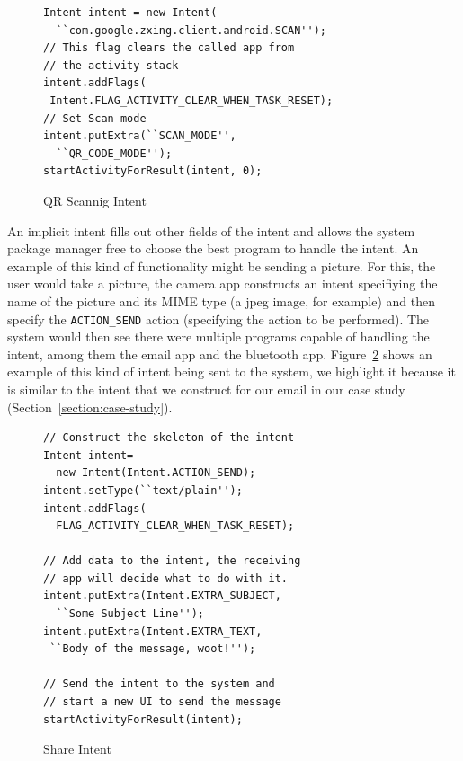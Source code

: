 \documentclass{acm_proc_article-sp}
\begin{document}
\begin{figure}
  \caption{QR Scannig Intent}
  \label{fig:qr-scanning-intent}
  \begin{lstlisting}
Intent intent = new Intent(
  ``com.google.zxing.client.android.SCAN'');
// This flag clears the called app from 
// the activity stack
intent.addFlags(
 Intent.FLAG_ACTIVITY_CLEAR_WHEN_TASK_RESET);
// Set Scan mode
intent.putExtra(``SCAN_MODE'', 
  ``QR_CODE_MODE'');
startActivityForResult(intent, 0);
  \end{lstlisting}
\end{figure}

An implicit intent fills out other fields of the intent
and allows the system package manager free to choose the best program
to handle the intent.  An example of this kind of functionality might
be sending a picture.  For this, the user would take a picture, the
camera app constructs an intent specifiying the name of the picture
and its MIME type (a jpeg image, for example) and then specify the
\texttt{ACTION\_SEND} action (specifying the action to be performed).  The
system would then see there were multiple programs capable of handling
the intent, among them the email app and the bluetooth app.
Figure~\ref{fig:share-intent} 
shows an example of this kind of intent
being sent to the system, we highlight it because it is similar to
the intent that we construct for our email in our case study
(Section~\ref{section:case-study}).

\begin{figure}
  \begin{lstlisting}
// Construct the skeleton of the intent
Intent intent=
  new Intent(Intent.ACTION_SEND);
intent.setType(``text/plain'');
intent.addFlags(
  FLAG_ACTIVITY_CLEAR_WHEN_TASK_RESET);

// Add data to the intent, the receiving
// app will decide what to do with it.
intent.putExtra(Intent.EXTRA_SUBJECT, 
  ``Some Subject Line'');
intent.putExtra(Intent.EXTRA_TEXT,
 ``Body of the message, woot!'');

// Send the intent to the system and
// start a new UI to send the message
startActivityForResult(intent);
\end{lstlisting}
\caption{Share Intent}
\label{fig:share-intent}
\end{figure}
\end{document}
